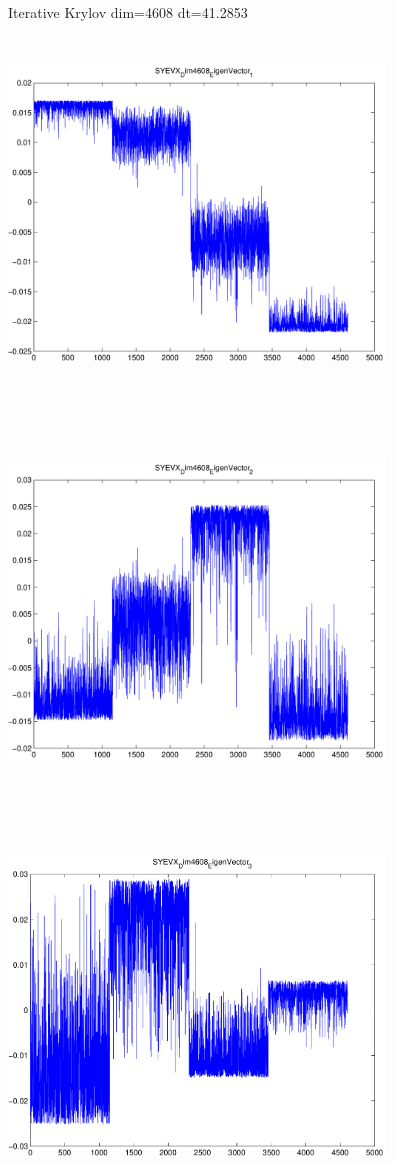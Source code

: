 \documentclass[9pt]{article}
\theoremstyle{plain}
\theoremstyle{definition}
\theoremstyle{remark}
\numberwithin{equation}{section}
\begin{document}
Iterative Krylov dim=4608 dt=41.2853
\includegraphics[width=10.0cm,height=10.0cm]{SYEVX_Dim4608_EigenVector_1.pdf}

\includegraphics[width=10.0cm,height=10.0cm]{SYEVX_Dim4608_EigenVector_2.pdf}

\includegraphics[width=10.0cm,height=10.0cm]{SYEVX_Dim4608_EigenVector_3.pdf}
\end{document}
